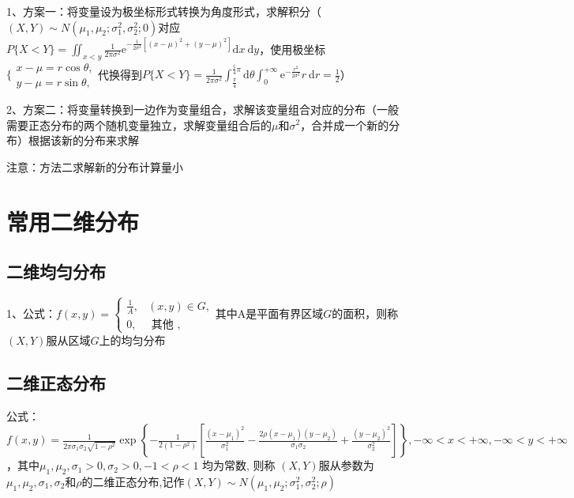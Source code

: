 1、方案一：将变量设为极坐标形式转换为角度形式，求解积分（$(X, Y) \sim N\left(\mu_{1}, \mu_{2} ; \sigma_{1}^{2}, \sigma_{2}^{2} ; 0\right)$对应$P\{X<Y\}=\iint_{x<y} \frac{1}{2 \pi \sigma^{2}} \mathrm{e}^{-\frac{1}{2 \sigma^{2}}\left[(x-\mu)^{2}+(y-\mu)^{2}\right]} \mathrm{d} x \mathrm{~d} y$，使用极坐标$\{\begin{array}{l}x-\mu=r \cos \theta, \\ y-\mu=r \sin \theta,\end{array}$代换得到$P\{X<Y\}=\frac{1}{2 \pi \sigma^{2}} \int_{\frac{\pi}{4}}^{\frac{5}{4} \pi} \mathrm{d} \theta \int_{0}^{+\infty} \mathrm{e}^{-\frac{r^{2}}{2 \sigma^{2}}} r \mathrm{~d} r=\frac{1}{2}$）

2、方案二：将变量转换到一边作为变量组合，求解该变量组合对应的分布（一般需要正态分布的两个随机变量独立，求解变量组合后的$\mu$和$\sigma^{2}$，合并成一个新的分布）根据该新的分布来求解

注意：方法二求解新的分布计算量小



\section{常用二维分布}



\subsection{二维均匀分布}

1、公式：$f(x, y)=\left\{\begin{array}{lc} \frac{1}{A}, & (x, y) \in G, \\ 0, & \text { 其他 }, \end{array}\right.$其中A是平面有界区域$G$的面积，则称$(X,Y)$服从区域$G$上的均匀分布



\subsection{二维正态分布}

公式：$f(x, y)=\frac{1}{2 \pi \sigma_{1} \sigma_{2} \sqrt{1-\rho^{2}}} \exp \left\{-\frac{1}{2\left(1-\rho^{2}\right)}\left[\frac{\left(x-\mu_{1}\right)^{2}}{\sigma_{1}^{2}}-\frac{2 \rho\left(x-\mu_{1}\right)\left(y-\mu_{2}\right)}{\sigma_{1} \sigma_{2}}+\frac{\left(y-\mu_{2}\right)^{2}}{\sigma_{2}^{2}}\right]\right\}, -\infty<x<+\infty,-\infty<y<+\infty$，其中$\mu_{1}, \mu_{2}, \sigma_{1}>0, \sigma_{2}>0,-1<\rho<1$ 均为常数, 则称 $(X, Y) $服从参数为$\mu_{1}, \mu_{2}, \sigma_{1}, \sigma_{2}$和$\rho$的二维正态分布,记作$(X, Y) \sim N\left(\mu_{1}, \mu_{2} ; \sigma_{1}^{2}, \sigma_{2}^{2} ; \rho\right)$

